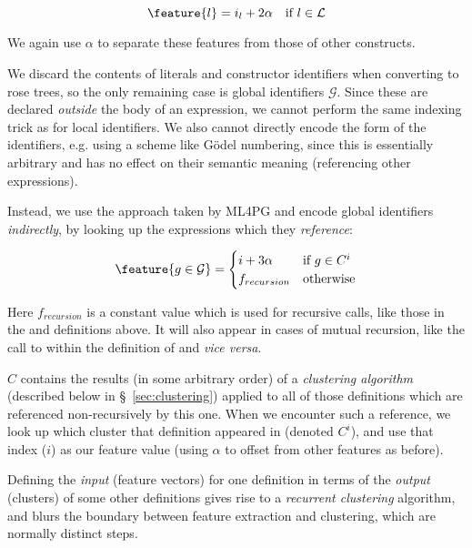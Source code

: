 \begin{equation} \label{eq:localfeature}
  \feature{l} = i_l + 2 \alpha \quad \text{if $l \in \mathcal{L}$}
\end{equation}

We again use $\alpha$ to separate these features from those of other constructs.

We discard the contents of literals and constructor identifiers when converting
to rose trees, so the only remaining case is global identifiers
$\mathcal{G}$. Since these are declared \emph{outside} the body of an
expression, we cannot perform the same indexing trick as for local
identifiers. We also cannot directly encode the form of the identifiers,
e.g. using a scheme like G{\"o}del numbering, since this is essentially
arbitrary and has no effect on their semantic meaning (referencing other
expressions).

Instead, we use the approach taken by ML4PG and encode global identifiers
\emph{indirectly}, by looking up the expressions which they \emph{reference}:

\begin{equation} \label{eq:globalfeature}
  \feature{g \in \mathcal{G}} =
    \begin{cases}
      i + 3 \alpha \quad & \text{if $g \in C^i$} \\
      f_{recursion}         & \text{otherwise}
    \end{cases}
\end{equation}

Here $f_{recursion}$ is a constant value which is used for recursive calls, like
those in the  and  definitions above. It will also appear in
cases of mutual recursion, like the call to  within the definition of
 and \emph{vice versa}.

$C$ contains the results (in some arbitrary order) of a \emph{clustering
  algorithm} (described below in \S~\ref{sec:clustering}) applied to all of
those definitions which are referenced non-recursively by this one. When we
encounter such a reference, we look up which cluster that definition appeared
in (denoted $C^i$), and use that index ($i$) as our feature value (using
$\alpha$ to offset from other features as before).

Defining the \emph{input} (feature vectors) for one definition in terms of the
\emph{output} (clusters) of some other definitions gives rise to a
\emph{recurrent clustering} algorithm, and blurs the boundary between feature
extraction and clustering, which are normally distinct steps.


